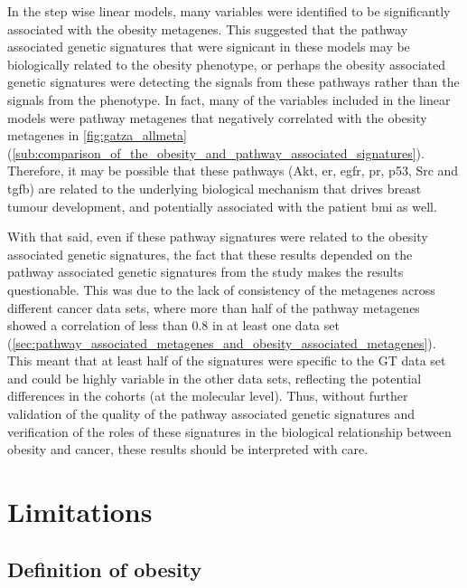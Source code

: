 In the step wise linear models, many variables were identified to be significantly associated with the obesity metagenes.
This suggested that the pathway associated genetic signatures that were signicant in these models may be biologically related to the obesity phenotype, or perhaps the obesity associated genetic signatures were detecting the signals from these pathways rather than the signals from the phenotype.
In fact, many of the variables included in the linear models were pathway metagenes that negatively correlated with the obesity metagenes in \cref{fig:gatza_allmeta} (\cref{sub:comparison_of_the_obesity_and_pathway_associated_signatures}).
Therefore, it may be possible that these pathways (Akt, \gls{er}, \gls{egfr}, \gls{pr}, p53, Src and \gls{tgfb}) are related to the underlying biological mechanism that drives breast tumour development, and potentially associated with the patient \gls{bmi} as well.

With that said, even if these pathway signatures were related to the obesity associated genetic signatures, the fact that these results depended on the pathway associated genetic signatures from the \citet{Gatza2010a} study makes the results questionable.
This was due to the lack of consistency of the metagenes across different cancer data sets, where more than half of the pathway metagenes showed a correlation of less than 0.8 in at least one data set (\cref{sec:pathway_associated_metagenes_and_obesity_associated_metagenes}).
This meant that at least half of the signatures were specific to the GT data set and could be highly variable in the other data sets, reflecting the potential differences in the cohorts (at the molecular level).
Thus, without further validation of the quality of the pathway associated genetic signatures and verification of the roles of these signatures in the biological relationship between obesity and cancer, these results should be interpreted with care.

\section{Limitations}
\label{sec:limitations}

\subsection{Definition of obesity}
\label{sub:discussion_definition_of_obesity}

